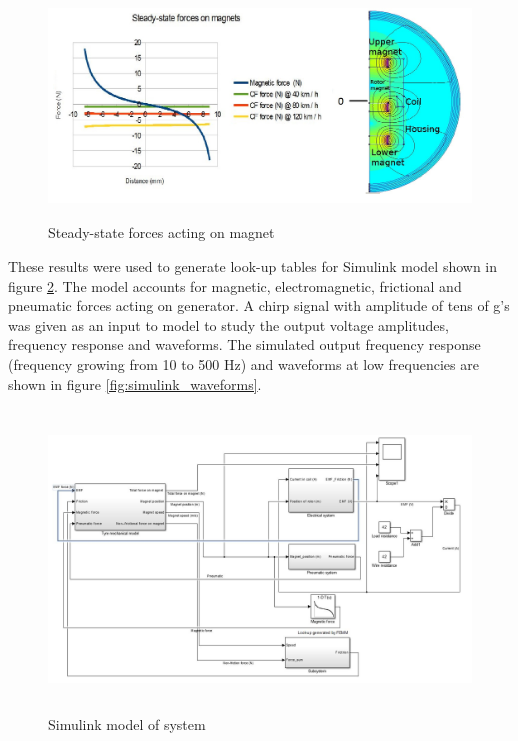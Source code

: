 \begin{figure}[htb]
  \begin{center}
  \includegraphics[height=6cm]{images/own_dwg/femm_fvsd_dualmagnet.jpg}
  \end{center}
  \caption{\label{femm_forces} Steady-state forces acting on magnet}
\end{figure}

These results were used to generate look-up tables for Simulink model shown in figure \ref{fig:simulink}. The model accounts for magnetic, electromagnetic, frictional and pneumatic forces acting on generator. A chirp signal with amplitude of tens of g's was given as an input to model to study the output voltage amplitudes, frequency response and waveforms. The simulated output frequency response (frequency growing from 10 to 500 Hz) and waveforms at low frequencies are shown in figure \ref{fig:simulink_waveforms}.

\begin{figure}[htb]
  \begin{center}
  \includegraphics[height=8cm]{images/own_dwg/simulink.jpg}
  \end{center}
  \caption{\label{fig:simulink} Simulink model of system}
\end{figure}

